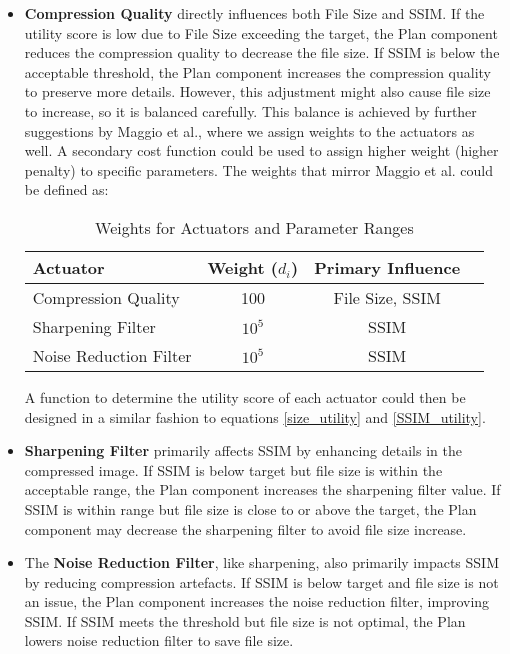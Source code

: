 \documentclass[conference]{IEEEtran}
\begin{document}
\begin{itemize}
	\item \textbf{Compression Quality} directly influences both File Size and SSIM. If the utility score is low due to File Size exceeding the target, the Plan component reduces the compression quality to decrease the file size. If SSIM is below the acceptable threshold, the Plan component increases the compression quality to preserve more details. However, this adjustment might also cause file size to increase, so it is balanced carefully. This balance is achieved by further suggestions by Maggio et al., where we assign weights to the actuators as well. A secondary cost function could be used to assign higher weight (higher penalty) to specific parameters. The weights that mirror Maggio et al. could be defined as:

	      \begin{table}[ht]
		      \centering
		      \caption{Weights for Actuators and Parameter Ranges}
		      \label{tab:actuator-weights}
		      \small
		      \begin{tabular}{lccc}
			      \toprule
			      \textbf{Actuator}      & \textbf{Weight ($d_i$)} & \textbf{Primary Influence} \\
			      \midrule
			      Compression Quality    & 100                     & File Size, SSIM            \\
			      Sharpening Filter      & $10^5$                  & SSIM                       \\
			      Noise Reduction Filter & $10^5$                  & SSIM                       \\
			      \bottomrule
		      \end{tabular}
	      \end{table}

	      \noindent A function to determine the utility score of each actuator could then be designed in a similar fashion to equations \ref{size_utility} and \ref{SSIM_utility}.\\

	\item \textbf{Sharpening Filter} primarily affects SSIM by enhancing details in the compressed image. If SSIM is below target but file size is within the acceptable range, the Plan component increases the sharpening filter value. If SSIM is within range but file size is close to or above the target, the Plan component may decrease the sharpening filter to avoid file size increase.

	\item The \textbf{Noise Reduction Filter}, like sharpening, also primarily impacts SSIM by reducing compression artefacts. If SSIM is below target and file size is not an issue, the Plan component increases the noise reduction filter, improving SSIM. If SSIM meets the threshold but file size is not optimal, the Plan lowers noise reduction filter to save file size.\\

\end{itemize}
\end{document}
